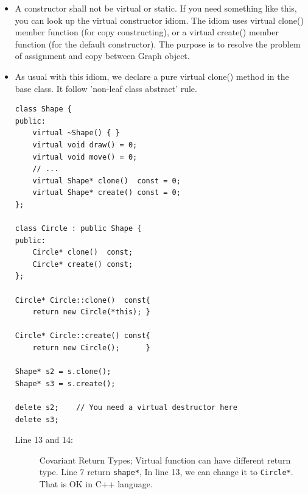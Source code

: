 \documentclass[a4paper,11pt,twoside]{book}
\begin{document}
\begin{itemize}
	\item A constructor shall not be virtual or static. If you need something like this, you can look up the virtual constructor idiom. The idiom uses virtual clone() member function (for copy constructing), or a virtual create() member function (for the default constructor). The purpose is to resolve the problem of assignment and copy between Graph object.
	
	\item As usual with this idiom, we declare a pure virtual clone() method in the base class. It follow 'non-leaf class abstract' rule.
	
\begin{lstlisting}
class Shape {
public:
	virtual ~Shape() { }                 
	virtual void draw() = 0;           
	virtual void move() = 0;
	// ...
	virtual Shape* clone()  const = 0;   
	virtual Shape* create() const = 0; 
};
	
class Circle : public Shape {
public:
	Circle* clone()  const;  
	Circle* create() const;   
};

Circle* Circle::clone()  const{
	return new Circle(*this); }
	
Circle* Circle::create() const{
	return new Circle();      }
	
Shape* s2 = s.clone();
Shape* s3 = s.create();
	
delete s2;    // You need a virtual destructor here
delete s3;
\end{lstlisting}
	\begin{description}
		\item[Line 13 and 14:] Covariant Return Types; Virtual function can have different return type. Line 7 return \texttt{shape*}, In line 13, we can change it to \texttt{Circle*}. That is OK in C++ language.
	\end{description}


\end{itemize}


	
\end{document}

